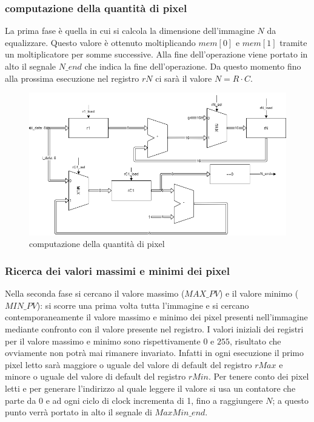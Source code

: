 \documentclass[11pt]{article} %
\begin{document}
\subsubsection{computazione della quantità di pixel}
La prima fase è quella in cui si calcola la dimensione dell'immagine $N$ da equalizzare. Questo valore è ottenuto moltiplicando $mem[0]$ e $mem[1]$ tramite un moltiplicatore per somme successive. Alla fine dell'operazione viene portato in alto il segnale $N\_end$ che indica la fine dell'operazione. Da questo momento fino alla prossima esecuzione nel registro $rN$ ci sarà il valore $N = R \cdot C$.

\begin{figure}[h]
\centering
\includegraphics[width=120mm]{../datapaths/regN.png}
\caption{computazione della quantità di pixel}
\end{figure}


\subsubsection{Ricerca dei valori massimi e minimi dei pixel}
Nella seconda fase si cercano il valore massimo ($MAX\_PV$) e il valore minimo ($MIN\_PV$): si scorre una prima volta tutta l'immagine e si cercano contemporaneamente il valore massimo e minimo dei pixel presenti nell'immagine mediante confronto con il valore presente nel registro. I valori iniziali dei registri per il valore massimo e minimo sono rispettivamente $0$ e $255$, risultato che ovviamente non potrà mai rimanere invariato. Infatti in ogni esecuzione il primo pixel letto sarà maggiore o uguale del valore di default del registro $rMax$ e minore o uguale del valore di default del registro $rMin$. Per tenere conto dei pixel letti e per generare l'indirizzo al quale leggere il valore si usa un contatore che parte da 0 e ad ogni ciclo di clock incrementa di 1, fino a raggiungere $N$; a questo punto verrà portato in alto il segnale di $MaxMin\_end$.
\end{document}
